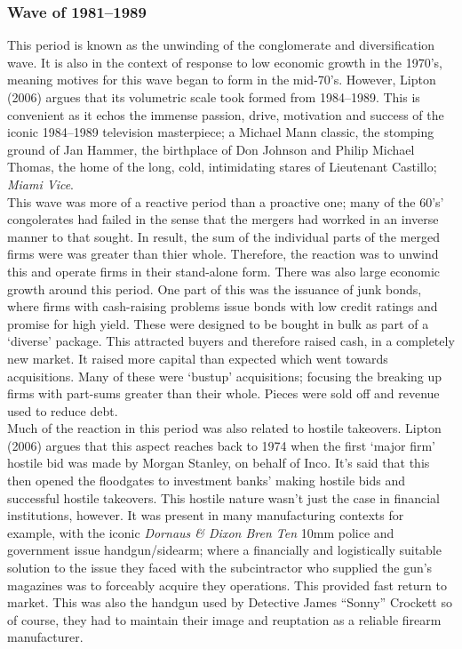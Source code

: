 \documentclass[11pt, english]{article}
\begin{document}
                \subsubsection*{Wave of 1981--1989}

        This period is known as the unwinding of the conglomerate and diversification wave. It is also in the context of response to low economic growth in the 1970's, meaning motives for this wave began to form in the mid-70's. However, Lipton (2006) argues that its volumetric scale took formed from 1984--1989. This is convenient as it echos the immense passion, drive, motivation and success of the iconic 1984--1989 television masterpiece; a Michael Mann classic, the stomping ground of Jan Hammer, the birthplace of Don Johnson and Philip Michael Thomas, the home of the long, cold, intimidating stares of Lieutenant Castillo; \textit{Miami Vice}.\\

        This wave was more of a reactive period than a proactive one; many of the 60's' congolerates had failed in the sense that the mergers had worrked in an inverse manner to that sought. In result, the sum of the individual parts of the merged firms were was greater than thier whole. Therefore, the reaction was to unwind this and operate firms in their stand-alone form. There was also large economic growth around this period. One part of this was the issuance of junk bonds, where firms with cash-raising problems issue bonds with low credit ratings and promise for high yield. These were designed to be bought in bulk as part of a `diverse' package. This attracted buyers and therefore raised cash, in a completely new market. It raised more capital than expected which went towards acquisitions. Many of these were `bustup' acquisitions; focusing the breaking up firms with part-sums greater than their whole. Pieces were sold off and revenue used to reduce debt.\\

        Much of the reaction in this period was also related to hostile takeovers. Lipton (2006) argues that this aspect reaches back to 1974 when the first `major firm' hostile bid was made by Morgan Stanley, on behalf of Inco. It's said that this then opened the floodgates to investment banks' making hostile bids and successful hostile takeovers. This hostile nature wasn't just the case in financial institutions, however. It was present in many manufacturing contexts for example, with the iconic \textit{Dornaus \& Dixon Bren Ten} 10mm police and government issue handgun/sidearm; where a financially and logistically suitable solution to the issue they faced with the subcintractor who supplied the gun's magazines was to forceably acquire they operations. This provided fast return to market. This was also the handgun used by Detective James ``Sonny'' Crockett so of course, they had to maintain their image and reuptation as a reliable firearm manufacturer.\\
\end{document}

